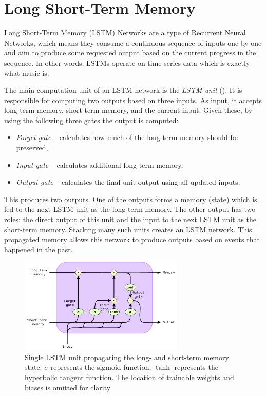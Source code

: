 \documentclass[a4paper, 11pt, twoside]{report}
\theoremstyle{definition}
\begin{document}
\section{Long Short-Term Memory}

Long Short-Term Memory (LSTM) Networks are a type of Recurrent Neural Networks, which means they consume a continuous sequence of inputs one by one and aim to produce some requested output based on the current progress in the sequence. In other words, LSTMs operate on time-series data which is exactly what music is. \par
The main computation unit of an LSTM network is the \textit{LSTM unit} (). It is responsible for computing two outputs based on three inputs. As input, it accepts long-term memory, short-term memory, and the current input. Given these, by using the following three gates the output is computed:

\begin{itemize}
    \item \textit{Forget gate} -- calculates how much of the long-term memory should be preserved,
    \item \textit{Input gate} -- calculates additional long-term memory,
    \item \textit{Output gate} -- calculates the final unit output using all updated inputs.
\end{itemize} \par

This produces two outputs. One of the outputs forms a memory (state) which is fed to the next LSTM unit as the long-term memory. The other output has two roles: the direct output of this unit and the input to the next LSTM unit as the short-term memory. Stacking many such units creates an LSTM network. This propagated memory allows this network to produce outputs based on events that happened in the past. \par

\begin{figure}
    \centering
    \includegraphics[width=0.7\textwidth]{lstm_unit.png}
    \caption{Single LSTM unit propagating the long- and short-term memory state. $\sigma$ represents the sigmoid function, $\tanh$ represents the hyperbolic tangent function. The location of trainable weights and biases is omitted for clarity}
    \label{fig:lstm_unit}
\end{figure}
\end{document}
